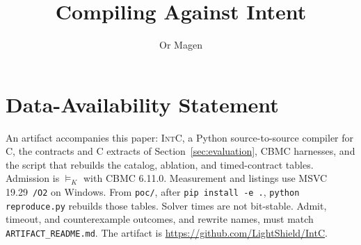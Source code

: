 \documentclass[acmsmall,screen,nonacm]{acmart}
\title{Compiling Against Intent}
\author{Or Magen}
\affiliation{\institution{Independent Researcher}\country{USA}}
\theoremstyle{acmdefinition}
\begin{document}
\maketitle











\section*{Data-Availability Statement}
\label{sec:data-availability}

An artifact accompanies this paper: \textsc{IntC}, a Python source-to-source
compiler for C, the contracts and C extracts of
Section~\ref{sec:evaluation}, CBMC harnesses, and the script that rebuilds
the catalog, ablation, and timed-contract tables. Admission is
\(\models_K\) with CBMC 6.11.0. Measurement and listings use
MSVC 19.29~\texttt{/O2} on Windows. From \texttt{poc/}, after
\texttt{pip install -e .}, \texttt{python reproduce.py} rebuilds those
tables. Solver times are not bit-stable. Admit, timeout, and
counterexample outcomes, and rewrite names, must match
\texttt{ARTIFACT\_README.md}.
The artifact is \url{https://github.com/LightShield/IntC}.




\appendix

\end{document}
